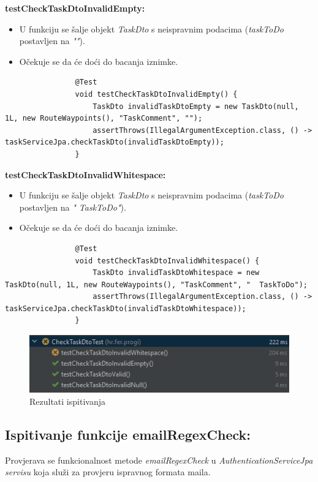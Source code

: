 			\textbf{testCheckTaskDtoInvalidEmpty:}
			\begin{itemize}
				\item U funkciju se šalje objekt \textit{TaskDto} s neispravnim podacima (\textit{taskToDo} postavljen na \textit{""}).
				\item Očekuje se da će doći do bacanja iznimke.
			\end{itemize}
			\begin{lstlisting}
				@Test
				void testCheckTaskDtoInvalidEmpty() {
					TaskDto invalidTaskDtoEmpty = new TaskDto(null, 1L, new RouteWaypoints(), "TaskComment", "");
					assertThrows(IllegalArgumentException.class, () -> taskServiceJpa.checkTaskDto(invalidTaskDtoEmpty));
				}
			\end{lstlisting}
			
			\textbf{testCheckTaskDtoInvalidWhitespace:}
			\begin{itemize}
				\item U funkciju se šalje objekt \textit{TaskDto} s neispravnim podacima (\textit{taskToDo} postavljen na \textit{"  TaskToDo"}).
				\item Očekuje se da će doći do bacanja iznimke.
			\end{itemize}
			\begin{lstlisting}
				@Test
				void testCheckTaskDtoInvalidWhitespace() {
					TaskDto invalidTaskDtoWhitespace = new TaskDto(null, 1L, new RouteWaypoints(), "TaskComment", "  TaskToDo");
					assertThrows(IllegalArgumentException.class, () -> taskServiceJpa.checkTaskDto(invalidTaskDtoWhitespace));
				}
			\end{lstlisting}
			
			\begin{figure}[H]
				\includegraphics[scale=1]{slike/checkTaskDtoTest.png} 
				\centering
				\caption{Rezultati ispitivanja}
				\label{fig:promjene}
			\end{figure}
			
			\subsection{Ispitivanje funkcije emailRegexCheck:}
			Provjerava se funkcionalnost metode \textit{emailRegexCheck} u \textit{AuthenticationServiceJpa servisu} koja služi za provjeru ispravnog formata maila.
			
